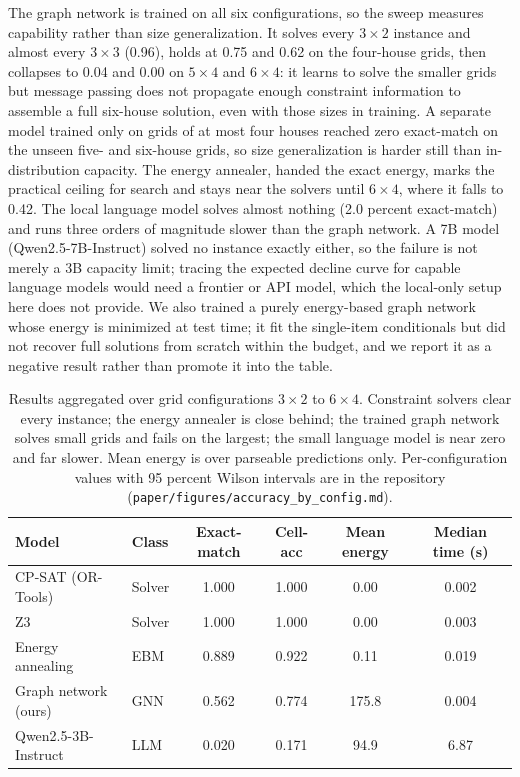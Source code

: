 \documentclass[11pt]{article}
\begin{document}
The graph network is trained on all six configurations, so the sweep measures
capability rather than size generalization. It solves every $3\times2$ instance and
almost every $3\times3$ (0.96), holds at 0.75 and 0.62 on the four-house grids, then
collapses to 0.04 and 0.00 on $5\times4$ and $6\times4$: it learns to solve the
smaller grids but message passing does not propagate enough constraint information
to assemble a full six-house solution, even with those sizes in training. A separate
model trained only on grids of at most four houses reached zero exact-match on the
unseen five- and six-house grids, so size generalization is harder still than
in-distribution capacity. The energy annealer, handed the exact energy, marks the
practical ceiling for search and stays near the solvers until $6\times4$, where it
falls to 0.42. The local language model solves almost nothing (2.0 percent
exact-match) and runs three orders of magnitude slower than the graph network. A
7B model (Qwen2.5-7B-Instruct) solved no instance exactly either, so the failure is
not merely a 3B capacity limit; tracing the expected decline curve for capable
language models would need a frontier or API model, which the local-only setup here
does not provide. We also trained a purely energy-based graph network whose energy
is minimized at test time; it fit the single-item conditionals but did not recover
full solutions from scratch within the budget, and we report it as a negative result
rather than promote it into the table.

\begin{table}[t]
\centering
\begin{tabular}{llcccc}
\toprule
Model & Class & Exact-match & Cell-acc & Mean energy & Median time (s) \\
\midrule
CP-SAT (OR-Tools)        & Solver & 1.000 & 1.000 & 0.00   & 0.002 \\
Z3                       & Solver & 1.000 & 1.000 & 0.00   & 0.003 \\
Energy annealing         & EBM    & 0.889 & 0.922 & 0.11   & 0.019 \\
Graph network (ours)     & GNN    & 0.562 & 0.774 & 175.8  & 0.004 \\
Qwen2.5-3B-Instruct      & LLM    & 0.020 & 0.171 & 94.9   & 6.87 \\
\bottomrule
\end{tabular}
\caption{Results aggregated over grid configurations $3\times2$ to $6\times4$.
Constraint solvers clear every instance; the energy annealer is close behind; the
trained graph network solves small grids and fails on the largest; the small
language model is near zero and far slower. Mean energy is over parseable
predictions only. Per-configuration values with 95 percent Wilson intervals are in
the repository (\texttt{paper/figures/accuracy\_by\_config.md}).}
\label{tab:results}
\end{table}
\end{document}
